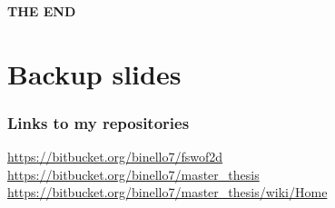 \documentclass[xcolor=dvipsnames, USenglish]{beamer}  %
\begin{document}
  {
  \begin{frame}[plain]
    \centering
    \Large{\textbf{THE END}}\\
  \end{frame}
  }



\section{Backup slides}
  \begin{frame}
    \frametitle{Links to my repositories}
    \small{\url{https://bitbucket.org/binello7/fswof2d}}\\
    \small{\url{https://bitbucket.org/binello7/master_thesis}}\\
    \small{\url{https://bitbucket.org/binello7/master_thesis/wiki/Home}}
  \end{frame}

\end{document}
